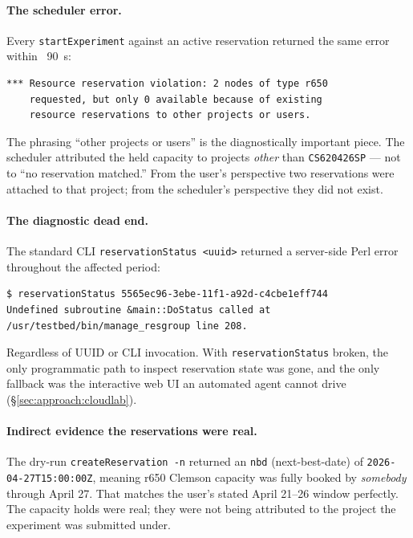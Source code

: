 \documentclass[11pt,a4paper]{article}
\begin{document}
\paragraph{The scheduler error.}\label{sec:postmortem-error} Every \texttt{startExperiment} against an active reservation returned the same error within ~90~s:
\begin{lstlisting}[basicstyle=\ttfamily\scriptsize]
*** Resource reservation violation: 2 nodes of type r650
    requested, but only 0 available because of existing
    resource reservations to other projects or users.
\end{lstlisting}
The phrasing ``other projects or users'' is the diagnostically important piece. The scheduler attributed the held capacity to projects \emph{other} than \texttt{CS620426SP} --- not to ``no reservation matched.'' From the user's perspective two reservations were attached to that project; from the scheduler's perspective they did not exist.

\paragraph{The diagnostic dead end.} The standard CLI \texttt{reservationStatus <uuid>} returned a server-side Perl error throughout the affected period:
\begin{lstlisting}[basicstyle=\ttfamily\scriptsize]
$ reservationStatus 5565ec96-3ebe-11f1-a92d-c4cbe1eff744
Undefined subroutine &main::DoStatus called at
/usr/testbed/bin/manage_resgroup line 208.
\end{lstlisting}
Regardless of UUID or CLI invocation. With \texttt{reservationStatus} broken, the only programmatic path to inspect reservation state was gone, and the only fallback was the interactive web UI an automated agent cannot drive (\S\ref{sec:approach:cloudlab}).

\paragraph{Indirect evidence the reservations were real.} The dry-run \texttt{createReservation -n} returned an \texttt{nbd} (next-best-date) of \texttt{2026-04-27T15:00:00Z}, meaning r650 Clemson capacity was fully booked by \emph{somebody} through April 27. That matches the user's stated April 21--26 window perfectly. The capacity holds were real; they were not being attributed to the project the experiment was submitted under.
\end{document}
